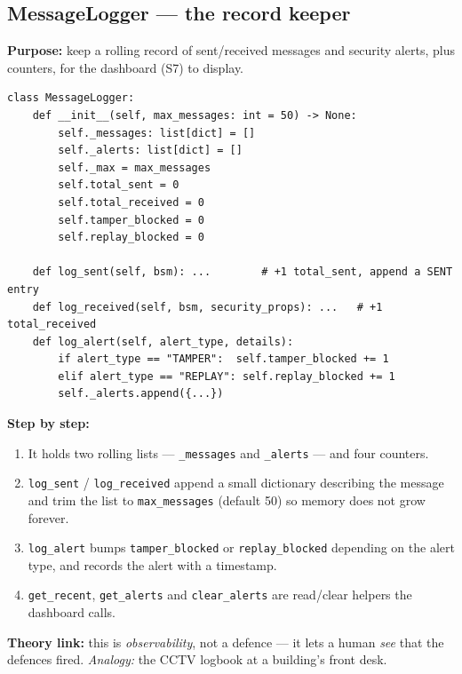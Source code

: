 \documentclass[11pt,a4paper]{article}
\begin{document}
\subsection{MessageLogger --- the record keeper}
\textbf{Purpose:} keep a rolling record of sent/received messages and security
alerts, plus counters, for the dashboard (S7) to display.
\begin{lstlisting}[style=py,caption={v2v\_protocol.py --- MessageLogger (key parts).}]
class MessageLogger:
    def __init__(self, max_messages: int = 50) -> None:
        self._messages: list[dict] = []
        self._alerts: list[dict] = []
        self._max = max_messages
        self.total_sent = 0
        self.total_received = 0
        self.tamper_blocked = 0
        self.replay_blocked = 0

    def log_sent(self, bsm): ...        # +1 total_sent, append a SENT entry
    def log_received(self, bsm, security_props): ...   # +1 total_received
    def log_alert(self, alert_type, details):
        if alert_type == "TAMPER":  self.tamper_blocked += 1
        elif alert_type == "REPLAY": self.replay_blocked += 1
        self._alerts.append({...})
\end{lstlisting}
\textbf{Step by step:}
\begin{enumerate}
  \item It holds two rolling lists --- \texttt{\_messages} and \texttt{\_alerts}
        --- and four counters.
  \item \texttt{log\_sent} / \texttt{log\_received} append a small dictionary
        describing the message and trim the list to \texttt{max\_messages}
        (default 50) so memory does not grow forever.
  \item \texttt{log\_alert} bumps \texttt{tamper\_blocked} or
        \texttt{replay\_blocked} depending on the alert type, and records the
        alert with a timestamp.
  \item \texttt{get\_recent}, \texttt{get\_alerts} and \texttt{clear\_alerts} are
        read/clear helpers the dashboard calls.
\end{enumerate}
\textbf{Theory link:} this is \emph{observability}, not a defence --- it lets a
human \emph{see} that the defences fired. \emph{Analogy:} the CCTV logbook at a
building's front desk.
\end{document}
